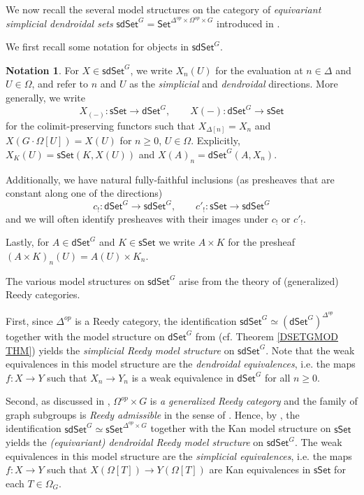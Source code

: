 \documentclass[a4paper,10pt
,draft
]{article}%
\numberwithin{equation}{section}
\numberwithin{figure}{section}
\theoremstyle{definition} %
\newtheorem{notation}[equation]{Notation}%
\newcommand{\longto}{\longrightarrow}%
\newcommand{\Set}{\ensuremath{\mathsf{Set}}}
\newcommand{\sSet}{\ensuremath{\mathsf{sSet}}}%
\newcommand{\dSet}{\mathsf{dSet}}
\newcommand{\1}{\ensuremath{\mathbbm 1}}%
\begin{document}
We now recall the several model structures on the category of
\textit{equivariant simplicial dendroidal sets}
$\mathsf{sdSet}^G = \Set^{\Delta^{op} \times \Omega^{op} \times G}$
introduced in \cite{BP_edss}.

We first recall some notation for objects in $\mathsf{sdSet}^G$.

\begin{notation}
      For $X \in \mathsf{sdSet}^G$, we write $X_n(U)$ for the evaluation at $n \in \Delta$ and $U \in \Omega$,
      and refer to $n$ and $U$ as the \textit{simplicial} and \textit{dendroidal} directions.
      More generally, we write
      \begin{equation}
            \label{SDSET_EQ}
            X_{(-)} \colon \sSet \to \dSet^G,
            \qquad
            X(-) \colon \dSet^G \to \sSet
      \end{equation}
      for the colimit-preserving functors
      such that $X_{\Delta[n]} = X_n$ and 
      $X\left(G \cdot\Omega[U]\right) = X(U)$ for $n \geq 0$, $U \in \Omega$.
      Explicitly, $X_K(U) = \sSet(K, X(U))$ and $X(A)_n = \dSet^G(A, X_n)$.
      
	Additionally, we have natural fully-faithful inclusions
	(as presheaves that are constant along one of the directions)
\[
	c_{!} \colon \dSet^G \longto \mathsf{sdSet}^G,
		\qquad
	c'_! \colon \sSet \longto \mathsf{sdSet}^G
\]
	and we will often identify presheaves with their images under $c_!$ or $c'_!$.

	Lastly, for $A \in \dSet^G$ and $K \in \sSet$ we write $A \times K$ for the presheaf $(A \times K)_n(U) = A(U) \times K_n$.
\end{notation}


The various model structures on $\mathsf{sdSet}^G$ arise
from the theory of (generalized) Reedy categories.


First, since $\Delta^{op}$ is a Reedy category,
the identification
$\mathsf{sdSet}^G \simeq 
\left(\mathsf{dSet}^G\right)^{\Delta^{op}}$
together with the model structure on 
$\mathsf{dSet}^G$ from \cite{Per18}
(cf. Theorem \ref{DSETGMOD THM})
yields the 
\textit{simplicial Reedy model structure} on $\mathsf{sdSet}^G$.
Note that the weak equivalences in this model structure
are the \textit{dendroidal equivalences},
i.e. the maps
$f \colon X \to Y$
such that $X_n \to Y_n$ is a weak equivalence in $\dSet^G$ for all $n \geq 0$.

Second, as discussed in 
\cite[Ex. A.7]{BP_edss},
$\Omega^{op} \times G$ is \emph{a generalized Reedy category}
and the family of graph subgroups is
\emph{Reedy admissible}
in the sense of \cite[Ex. A.2]{BP_edss}.
Hence, by \cite[Thm. A.8]{BP_edss},
the identification 
$\mathsf{sdSet}^G \simeq 
\mathsf{sSet}^{\Delta^{op} \times G}$
together with the Kan model structure on 
$\mathsf{sSet}$
yields the 
\textit{(equivariant) dendroidal Reedy model structure} on $\mathsf{sdSet}^G$.
The weak equivalences in this model structure are the
\emph{simplicial equivalences},
i.e. the maps $f \colon X \to Y$
such that 
$X(\Omega[T]) \to Y(\Omega[T])$
are Kan equivalences in $\mathsf{sSet}$
for each $T \in \Omega_G$.
\end{document}
